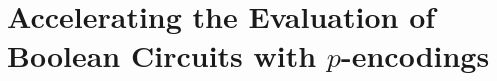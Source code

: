 

%






%
%
%
%
%
%
%
%
%
%



\chapter[Accelerating Homomorphic Boolean Functions]{Accelerating the Evaluation of Boolean Circuits with $p$-encodings}
\label{chap:p_encodings}












